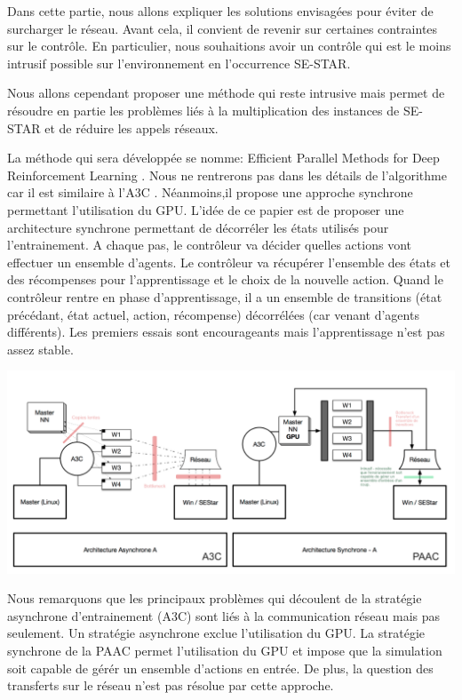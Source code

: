 Dans cette partie, nous allons expliquer les solutions envisagées pour éviter de surcharger le réseau. Avant cela, il convient de revenir sur certaines contraintes sur le contrôle. En particulier, nous souhaitions avoir un contrôle qui est le moins intrusif possible sur l'environnement en l'occurrence SE-STAR.

Nous allons cependant proposer une méthode qui reste intrusive mais permet de résoudre en partie les problèmes liés à la multiplication des instances de SE-STAR et de réduire les appels réseaux. 

La méthode qui sera développée se nomme: Efficient Parallel Methods for Deep Reinforcement Learning \cite{2017arXiv170504862C}. Nous ne rentrerons pas dans les détails de l'algorithme car il est similaire à l'A3C \cite{DBLP:journals/corr/MnihBMGLHSK16}. Néanmoins,il propose une approche synchrone permettant l'utilisation du GPU. L'idée de ce papier est de proposer une architecture synchrone permettant de décorréler les états utilisés pour l'entrainement. A chaque pas, le contrôleur va décider quelles actions vont effectuer un ensemble d'agents. Le contrôleur va récupérer l'ensemble des états et des récompenses pour l'apprentissage et le choix de la nouvelle action. Quand le contrôleur rentre en phase d'apprentissage, il a un ensemble de transitions (état précédant, état actuel, action, récompense) décorrélées (car venant d'agents différents). Les premiers essais sont encourageants mais l'apprentissage n'est pas assez stable.


\begin{center}
\includegraphics[scale=.4]{./assets/interfaceReseau/paaca3c}
\end{center}

Nous remarquons que les principaux problèmes qui découlent de la stratégie asynchrone d'entrainement (A3C) sont liés à la communication réseau mais pas seulement. Un stratégie asynchrone exclue l'utilisation du \gls{GPU}. La stratégie synchrone de la \gls{PAAC} permet l'utilisation du GPU et impose que la simulation soit capable de gérér un ensemble d'actions en entrée. De plus, la question des transferts sur le réseau n'est pas résolue par cette approche. 

